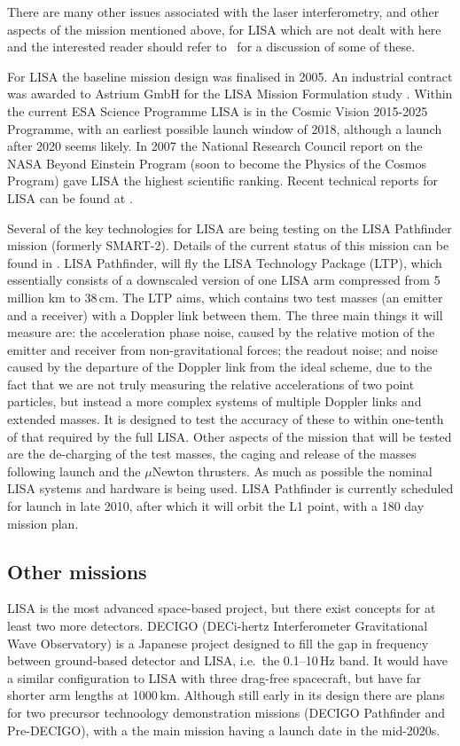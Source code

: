 \documentclass{article}
\begin{document}
There are many other issues associated with the laser interferometry, and other
aspects of the mission mentioned above, for LISA which are not dealt with here
and the interested reader should refer to~\cite{Houghetal, Jennrich:2009,
Johann:2008} for a discussion of some of these.

For LISA the baseline mission design was finalised in 2005. An industrial
contract was awarded to Astrium GmbH for the LISA Mission Formulation study
\cite{Johann:2008}. Within the current ESA Science Programme LISA is in the
Cosmic Vision 2015-2025 Programme, with an earliest possible launch window of
2018, although a launch after 2020 seems likely. In 2007 the National Research
Council report on the NASA Beyond Einstein Program (soon to become the Physics
of the Cosmos Program) gave LISA the highest scientific ranking. Recent
technical reports for LISA can be found at \cite{LISATechReports}.

Several of the key technologies for LISA are being testing on the LISA
Pathfinder mission (formerly SMART-2). Details of the current status of this
mission can be found in \cite{Armano:2009}. LISA Pathfinder, will fly the
LISA Technology Package (LTP), which essentially consists of a downscaled
version of one LISA arm compressed from 5 million km to 38\,cm. The LTP aims,
which contains two test masses (an emitter and a receiver) with a Doppler link
between them. The three main things it will measure are: the acceleration phase
noise, caused by the relative motion of the emitter and receiver from
non-gravitational forces; the readout noise; and noise caused by the departure
of the Doppler link from the ideal scheme, due to the fact that we are not
truly measuring the relative accelerations of two point particles, but instead
a more complex systems of multiple Doppler links and extended masses. It is
designed to test the accuracy of these to within one-tenth of that required by
the full LISA. Other aspects of the mission that will be tested are the
de-charging of the test masses, the caging and release of the masses following
launch and the $\mu$Newton thrusters. As much as possible the nominal LISA
systems and hardware is being used. LISA Pathfinder is currently scheduled for
launch in late 2010, after which it will orbit the L1 point, with a 180 day
mission plan.

\subsection{Other missions}
LISA is the most advanced space-based project, but there exist concepts for at
least two more detectors. DECIGO (DECi-hertz Interferometer Gravitational Wave
Observatory) \cite{Sato:2009} is a Japanese project designed to fill the gap in
frequency between ground-based detector and LISA, i.e.\ the 0.1--10\,Hz band. It
would have a similar configuration to LISA with three drag-free spacecraft, but
have far shorter arm lengths at 1000\,km. Although still early in its design
there are plans for two precursor technoology demonstration missions (DECIGO
Pathfinder \cite{Ando:2009} and Pre-DECIGO), with a the main mission having a
launch date in the mid-2020s.
\end{document}
